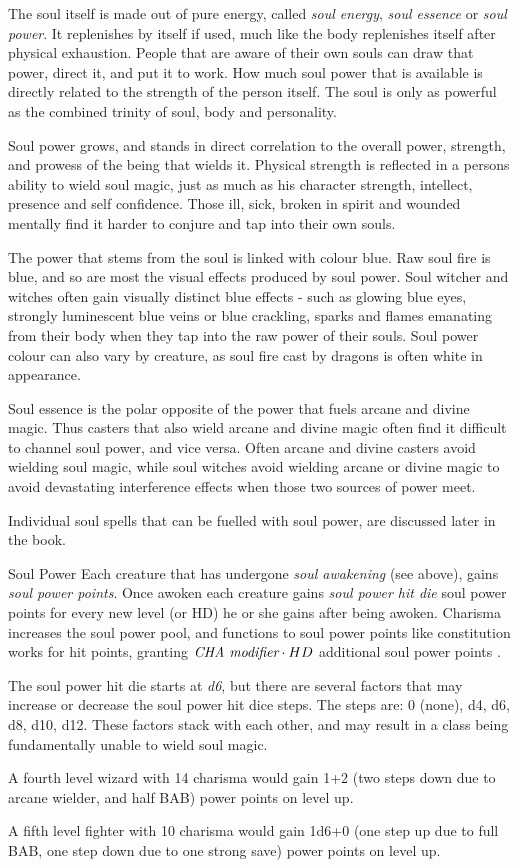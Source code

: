 The soul itself is made out of pure energy, called \emph{soul energy},
\emph{soul essence} or \emph{soul power}. It replenishes by itself if used,
much like the body replenishes itself after physical exhaustion. People that
are aware of their own souls can draw that power, direct it, and put it to
work. How much soul power that is available is directly related to the
strength of the person itself. The soul is only as powerful as the combined
trinity of soul, body and personality.

Soul power grows, and stands in direct correlation to the overall power,
strength, and prowess of the being that wields it. Physical strength is
reflected in a persons ability to wield soul magic, just as much as his
character strength, intellect, presence and self confidence. Those ill, sick,
broken in spirit and wounded mentally find it harder to conjure and tap into
their own souls.

The power that stems from the soul is linked with colour blue. Raw soul fire
is blue, and so are most the visual effects produced by soul power. Soul
witcher and witches often gain visually distinct blue effects - such as
glowing blue eyes, strongly luminescent blue veins or blue crackling, sparks
and flames emanating from their body when they tap into the raw power of
their souls. Soul power colour can also vary by creature, as soul fire cast
by dragons is often white in appearance.

Soul essence is the polar opposite of the power that fuels arcane and divine
magic. Thus casters that also wield arcane and divine magic often find it
difficult to channel soul power, and vice versa. Often arcane and divine
casters avoid wielding soul magic, while soul witches avoid wielding arcane or
divine magic to avoid devastating interference effects when those two sources
of power meet.

Individual soul spells that can be fuelled with soul power, are discussed
later in the book.

\begin{35e}{Soul Power}
  Each creature that has undergone \emph{soul awakening} (see above), gains
  \emph{soul power points}. Once awoken each creature gains \emph{soul power
    hit die} soul power points for every new level (or HD) he or she gains after
  being awoken. Charisma increases the soul power pool, and functions to soul
  power points like constitution works for hit points, granting
  $ \emph{CHA modifier} \cdot HD $ additional soul power points .

  The soul power hit die starts at \emph{d6}, but there are several factors
  that may increase or decrease the soul power hit dice steps. The steps are:
  0 (none), d4, d6, d8, d10, d12. These factors stack with each other, and may
  result in a class being fundamentally unable to wield soul magic.

  A fourth level wizard with 14 charisma would gain 1+2 (two steps down due to
  arcane wielder, and half BAB) power points on level up.

  A fifth level fighter with 10 charisma would gain 1d6+0 (one step up due to
  full BAB, one step down due to one strong save) power points on level up.
\end{35e}

